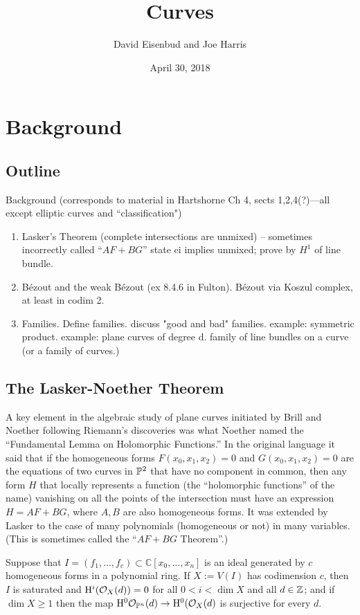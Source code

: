 \documentclass[12pt, leqno]{book}
\date{April 30, 2018}
\title{Curves}
\author{David Eisenbud and Joe Harris }
\def\CC{{\mathbb C}}
\begin{document}
\chapter{Background}
\section*{Outline}
 Background (corresponds to material in Hartshorne Ch 4, sects 1,2,4(?)---all except elliptic curves and ``classification")
\begin{enumerate}

\item Lasker's Theorem (complete intersections are unmixed) -- sometimes incorrectly called ``$AF+BG$''
state ci implies unmixed; prove by $H^1$ of line bundle.

\item B\'ezout and the  weak B\'ezout (ex 8.4.6 in Fulton).
B\'ezout via Koszul complex, at least in codim 2.

\item Families. Define families. discuss "good and bad" families. example: symmetric product. example: plane curves of degree d. family of line bundles on a curve (or a family of curves.)


\end{enumerate}

\section{The Lasker-Noether Theorem}

A key element in the algebraic study of plane curves initiated by Brill and Noether following Riemann's discoveries was what Noether named the ``Fundamental Lemma on Holomorphic Functions.'' In the original language it said that if the homogeneous forms $F(x_{0},x_{1},x_{2})=0$ and $G(x_{0},x_{1},x_{2})=0$ are the equations of two curves in $\PP^{2}$ that have no component in common, then any form $H$ that locally represents a function (the ``holomorphic functions'' of the name) vanishing on all the points
of the intersection must have an expression $H = AF+BG$, where $A,B$ are also homogeneous forms. It was extended by Lasker to the case of many polynomials (homogeneous or not) in many variables. (This is sometimes called the ``$AF+BG$ Theorem''.) 

\begin{theorem}\label{Lasker}
Suppose that $I = (f_{1}, \dots, f_{c}) \subset \CC[x_{0},\dots,x_{n}]$ is an ideal generated by $c$ homogeneous forms in a polynomial ring. 
If $X:= V(I)$ has codimension $c$, then $I$ is saturated and $\HH^{i}(\cO_{X}(d)) = 0$ for all $0<i<\dim X$ and all $d\in \ZZ$; and if $\dim X\geq 1$
then the map
$\HH^{0}\cO_{\PP^{n}}(d) \to \HH^{0}(\cO_{X}(d)$ is surjective for every $d$.
\end{theorem}
\end{document}
